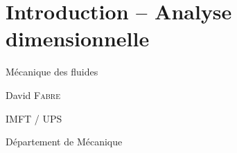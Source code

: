 


\section{Introduction -- Analyse dimensionnelle}


\begin{frame}

  \color{bleu}

  \begin{flushleft}
    
    \Large
   	\bf
    
    Mécanique des fluides 

  \end{flushleft}
  

  \begin{flushright}

    \rm

    \textrm{David} \textsc{Fabre}
    
    \vspace{3mm}
    
    IMFT / UPS
    
    Département de Mécanique
    

  \end{flushright}



\end{frame}
